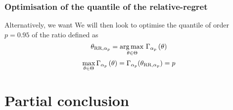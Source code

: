 \documentclass[../../Main_ManuscritThese.tex]{subfiles}
\newcommand\imgpath{/home/victor/acadwriting/Manuscrit/Text/Chapter5/img/}
\begin{document}
\subsubsection{Optimisation of the quantile of the relative-regret}

Alternatively, we want 
We will then look to optimise the quantile of order $p=0.95$ of the ratio defined as
\begin{equation}
  {\theta}_{\mathrm{RR},\alpha_p} = \operatorname*{arg\,max \,}_{\theta \in \Theta} \Gamma_{\alpha_p}\left(\theta\right)
\end{equation}
\begin{equation}
\max_{\theta\in\Theta}  \Gamma_{\alpha_p}\left(\theta\right) = \Gamma_{\alpha_p}(\theta_{\mathrm{RR}, \alpha_p}) = p
\end{equation}

\section{Partial conclusion}

%   

%   


\clearpage




\subfileLocal{
	\pagestyle{empty}
	
	
}
\end{document}
